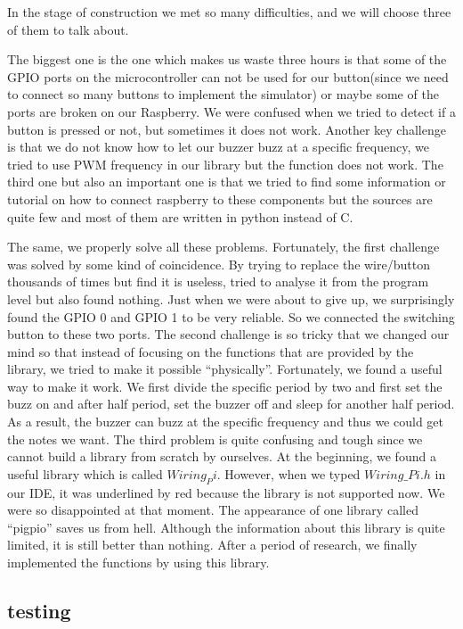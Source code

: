 \documentclass[11pt]{article}
\begin{document}
In the stage of construction we met so many difficulties, and we will choose three of them to talk about.

The biggest one is the one which makes us waste three hours is that some of the GPIO ports on the microcontroller can not be used for our button(since we need to connect so many buttons to implement the simulator) or maybe some of the ports are broken on our Raspberry. We were confused when we tried to detect if a button is pressed or not, but sometimes it does not work. Another key challenge is that we do not know how to let our buzzer buzz at a specific frequency, we tried to use PWM frequency in our library but the function does not work. The third one but also an important one is that we tried to find some information or tutorial on how to connect raspberry to these components but the sources are quite few and most of them are written in python instead of C.

The same, we properly solve all these problems. Fortunately, the first challenge was solved by some kind of coincidence. By trying to replace the wire/button thousands of times but find it is useless, tried to analyse it from the program level but also found nothing. Just when we were about to give up, we surprisingly found the GPIO 0 and GPIO 1 to be very reliable. So we connected the switching button to these two ports. The second challenge is so tricky that we changed our mind so that instead of focusing on the functions that are provided by the library, we tried to make it possible “physically”. Fortunately, we found a useful way to make it work. We first divide the specific period by two and first set the buzz on and after half period, set the buzzer off and sleep for another half period. As a result, the buzzer can buzz at the specific frequency and thus we could get the notes we want. The third problem is quite confusing and tough since we cannot build a library from scratch by ourselves. At the beginning, we found a useful library which is called $Wiring_Pi$. However, when we typed $Wiring\_Pi.h$ in our IDE, it was underlined by red because the library is not supported now. We were so disappointed at that moment. The appearance of one library called “pigpio” saves us from hell. Although the information about this library is quite limited, it is still better than nothing. After a period of research, we finally implemented the functions by using this library. 


\subsection{testing}
\end{document}
